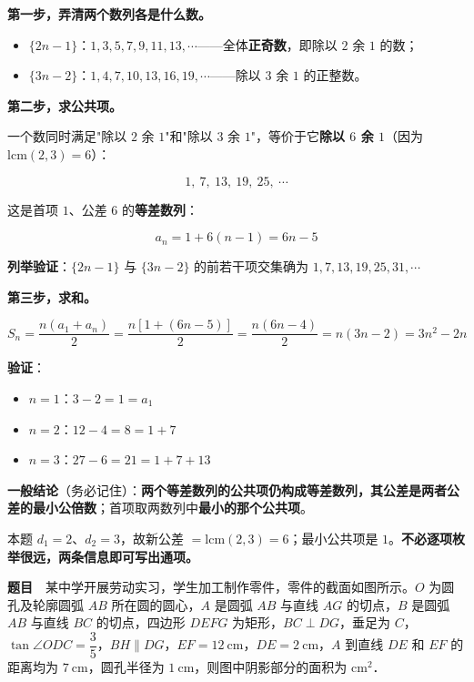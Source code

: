 \textbf{第一步，弄清两个数列各是什么数。}

\begin{itemize}
\item $\{2n-1\}$：$1,3,5,7,9,11,13,\cdots$——全体\textbf{正奇数}，即除以 $2$ 余 $1$ 的数；
\item $\{3n-2\}$：$1,4,7,10,13,16,19,\cdots$——除以 $3$ 余 $1$ 的正整数。
\end{itemize}

\textbf{第二步，求公共项。}

一个数同时满足"除以 $2$ 余 $1$"和"除以 $3$ 余 $1$"，等价于它\textbf{除以 $6$ 余 $1$}（因为 $\mathrm{lcm}(2,3)=6$）：

\[1,\ 7,\ 13,\ 19,\ 25,\ \cdots\]

这是首项 $1$、公差 $6$ 的\textbf{等差数列}：

\[a_n=1+6(n-1)=6n-5\]

\textbf{列举验证}：$\{2n-1\}$ 与 $\{3n-2\}$ 的前若干项交集确为 $1,7,13,19,25,31,\cdots$ 

\textbf{第三步，求和。}

\[S_n=\frac{n\left(a_1+a_n\right)}2=\frac{n\left[1+(6n-5)\right]}2=\frac{n(6n-4)}2=n(3n-2)=3n^{2}-2n\]

\textbf{验证}：

\begin{itemize}
\item $n=1$：$3-2=1=a_1$ 
\item $n=2$：$12-4=8=1+7$ 
\item $n=3$：$27-6=21=1+7+13$ 
\end{itemize}


\begin{gktip}
\textbf{一般结论}（务必记住）：\textbf{两个等差数列的公共项仍构成等差数列，其公差是两者公差的最小公倍数}；首项取两数列中\textbf{最小的那个公共项}。

本题 $d_1=2$、$d_2=3$，故新公差 $=\mathrm{lcm}(2,3)=6$；最小公共项是 $1$。\textbf{不必逐项枚举很远，两条信息即可写出通项。}
\end{gktip}

\par\medskip


\textbf{题目}　某中学开展劳动实习，学生加工制作零件，零件的截面如图所示。$O$ 为圆孔及轮廓圆弧 $AB$ 所在圆的圆心，$A$ 是圆弧 $AB$ 与直线 $AG$ 的切点，$B$ 是圆弧 $AB$ 与直线 $BC$ 的切点，四边形 $DEFG$ 为矩形，$BC\perp DG$，垂足为 $C$，$\tan\angle ODC=\dfrac35$，$BH\parallel DG$，$EF=12\ \mathrm{cm}$，$DE=2\ \mathrm{cm}$，$A$ 到直线 $DE$ 和 $EF$ 的距离均为 $7\ \mathrm{cm}$，圆孔半径为 $1\ \mathrm{cm}$，则图中阴影部分的面积为 \gkblank{} $\mathrm{cm}^{2}$．

